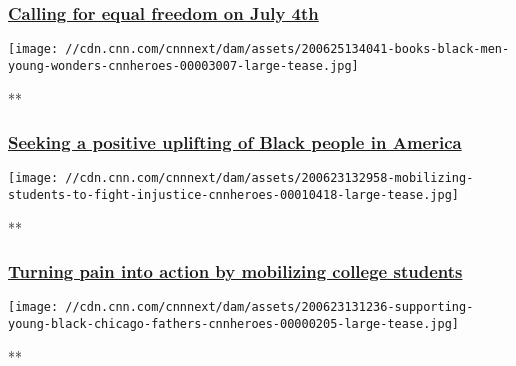\hypertarget{calling-for-equal-freedom-on-july-4th}{%
\subsubsection{\texorpdfstring{\href{/videos/tv/2020/07/02/july-4-blm-freedom-independence-cnnheroes.cnn}{Calling
for equal freedom on July
4th}}{Calling for equal freedom on July 4th}}\label{calling-for-equal-freedom-on-july-4th}}

\href{/videos/tv/2020/06/25/books-black-men-young-wonders-cnnheroes.cnn}{}

\texttt{[image: //cdn.cnn.com/cnnnext/dam/assets/200625134041-books-black-men-young-wonders-cnnheroes-00003007-large-tease.jpg]}

**

\hypertarget{seeking-a-positive-uplifting-of-black-people-in-america}{%
\subsubsection{\texorpdfstring{\href{/videos/tv/2020/06/25/books-black-men-young-wonders-cnnheroes.cnn}{Seeking
a positive uplifting of Black people in
America}}{Seeking a positive uplifting of Black people in America}}\label{seeking-a-positive-uplifting-of-black-people-in-america}}

\href{/videos/tv/2020/06/23/mobilizing-students-to-fight-injustice-cnnheroes.cnn}{}

\texttt{[image: //cdn.cnn.com/cnnnext/dam/assets/200623132958-mobilizing-students-to-fight-injustice-cnnheroes-00010418-large-tease.jpg]}

**

\hypertarget{turning-pain-into-action-by-mobilizing-college-students}{%
\subsubsection{\texorpdfstring{\href{/videos/tv/2020/06/23/mobilizing-students-to-fight-injustice-cnnheroes.cnn}{Turning
pain into action by mobilizing college
students}}{Turning pain into action by mobilizing college students}}\label{turning-pain-into-action-by-mobilizing-college-students}}

\href{/videos/tv/2020/06/23/supporting-young-black-chicago-fathers-cnnheroes.cnn}{}

\texttt{[image: //cdn.cnn.com/cnnnext/dam/assets/200623131236-supporting-young-black-chicago-fathers-cnnheroes-00000205-large-tease.jpg]}

**

